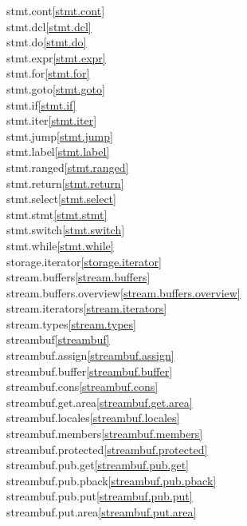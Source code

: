 \begin{multicols}{2}
stmt.cont\quad\ref{stmt.cont}\\
stmt.dcl\quad\ref{stmt.dcl}\\
stmt.do\quad\ref{stmt.do}\\
stmt.expr\quad\ref{stmt.expr}\\
stmt.for\quad\ref{stmt.for}\\
stmt.goto\quad\ref{stmt.goto}\\
stmt.if\quad\ref{stmt.if}\\
stmt.iter\quad\ref{stmt.iter}\\
stmt.jump\quad\ref{stmt.jump}\\
stmt.label\quad\ref{stmt.label}\\
stmt.ranged\quad\ref{stmt.ranged}\\
stmt.return\quad\ref{stmt.return}\\
stmt.select\quad\ref{stmt.select}\\
stmt.stmt\quad\ref{stmt.stmt}\\
stmt.switch\quad\ref{stmt.switch}\\
stmt.while\quad\ref{stmt.while}\\
storage.iterator\quad\ref{storage.iterator}\\
stream.buffers\quad\ref{stream.buffers}\\
stream.buffers.overview\quad\ref{stream.buffers.overview}\\
stream.iterators\quad\ref{stream.iterators}\\
stream.types\quad\ref{stream.types}\\
streambuf\quad\ref{streambuf}\\
streambuf.assign\quad\ref{streambuf.assign}\\
streambuf.buffer\quad\ref{streambuf.buffer}\\
streambuf.cons\quad\ref{streambuf.cons}\\
streambuf.get.area\quad\ref{streambuf.get.area}\\
streambuf.locales\quad\ref{streambuf.locales}\\
streambuf.members\quad\ref{streambuf.members}\\
streambuf.protected\quad\ref{streambuf.protected}\\
streambuf.pub.get\quad\ref{streambuf.pub.get}\\
streambuf.pub.pback\quad\ref{streambuf.pub.pback}\\
streambuf.pub.put\quad\ref{streambuf.pub.put}\\
streambuf.put.area\quad\ref{streambuf.put.area}\\

\end{multicols}
